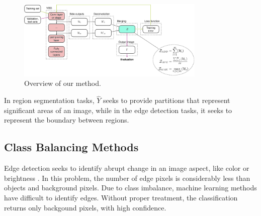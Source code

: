 \begin{figure}
  \centering
  \includegraphics[width=0.8\textwidth]{../imagens/ilustracoes/cap5_metodo.png} %
  \caption{Overview of our method.}
  \label{fig:method}
\end{figure}


In region segmentation tasks, $\hat{Y}$ seeks to provide partitions that represent significant areas of an image, while in the edge detection tasks, it seeks to represent the boundary between regions.

\subsection{Class Balancing Methods}
\label{cap5_balanc_classes}

Edge detection seeks to identify abrupt change in an image aspect, like color or brightness \cite{MARTIN:1273918}.
In this problem, the number of edge pixels is considerably less than objects and background pixels.
Due to class imbalance, machine learning methods have difficult to identify edges.
Without proper treatment, the classification returns only backgound pixels, with high confidence.

